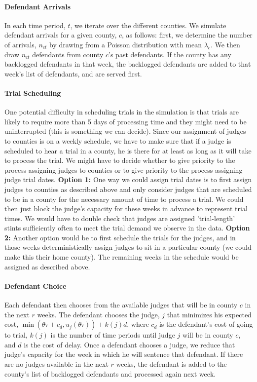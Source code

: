 \documentclass[11pt]{article}
\theoremstyle{ModifiedStyle}
\theoremstyle{ModifiedStyle}
\begin{document}
  \paragraph{Defendant Arrivals} In each time period, $t$, we iterate over the different counties. We simulate defendant arrivals for a given county, $c$, as follows: first, we determine the number of arrivals, $n_{ct}$ by drawing from a Poisson distribution with mean $\lambda_c$. We then draw $n_{ct}$ defendants from county $c$'s past defendants. If the county has any backlogged defendants in that week, the backlogged defendants are added to that week's list of defendants, and are served first.

  \paragraph{Trial Scheduling} One potential difficulty in scheduling trials in the simulation is that trials are likely to require more than 5 days of processing time and they might need to be uninterrupted (this is something we can decide). Since our assignment of judges to counties is on a weekly schedule, we have to make sure that if a judge is scheduled to hear a trial in a county, he is there for at least as long as it will take to process the trial. We might have to decide whether to give priority to the process assigning judges to counties or to give priority to the process assigning judge trial dates. \textbf{Option 1:} One way we could assign trial dates is to first assign judges to counties as described above and only consider judges that are scheduled to be in a county for the necessary amount of time to process a trial. We could then just block the judge's capacity for these weeks in advance to represent trial times. We would have to double check that judges are assigned 'trial-length' stints sufficiently often to meet the trial demand we observe in the data. \textbf{Option 2:} Another option would be to first schedule the trials for the judges, and in those weeks deterministically assign judges to sit in a particular county (we could make this their home county). The remaining weeks in the schedule would be assigned as described above.

  \paragraph{Defendant Choice} Each defendant then chooses from the available judges that will be in
  county $c$ in the next $r$ weeks. The defendant chooses the judge, $j$ that minimizes his expected cost, $\min(\theta \tau + c_d,u_j(\theta \tau)) + k(j)d$, where $c_d$ is the defendant's cost of going to trial, $k(j)$ is the number of time periods until judge $j$ will be in county $c$, and $d$ is the cost of delay. Once a defendant chooses a judge, we reduce that judge's capacity for the week in which he will sentence that defendant. If there are no judges available in the next $r$ weeks, the defendant is added to the county's list of backlogged defendants and processed again next week.
\end{document}
